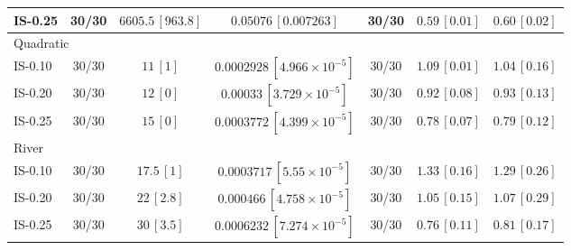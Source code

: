 \begin{tabular}{lcccccc}
IS-0.25 & 30/30 & $6605.5\, [963.8]$ & $0.05076\, [0.007263]$ & 30/30 & $0.59\, [0.01]$ & $0.60\, [0.02]$ \\
\midrule
\multicolumn{7}{l}{Quadratic} \\
IS-0.10 & 30/30 & $11\, [1]$ & $0.0002928\, [4.966\times10^{-5}]$ & 30/30 & $1.09\, [0.01]$ & $1.04\, [0.16]$ \\
IS-0.20 & 30/30 & $12\, [0]$ & $0.00033\, [3.729\times10^{-5}]$ & 30/30 & $0.92\, [0.08]$ & $0.93\, [0.13]$ \\
IS-0.25 & 30/30 & $15\, [0]$ & $0.0003772\, [4.399\times10^{-5}]$ & 30/30 & $0.78\, [0.07]$ & $0.79\, [0.12]$ \\
\midrule
\multicolumn{7}{l}{River} \\
IS-0.10 & 30/30 & $17.5\, [1]$ & $0.0003717\, [5.55\times10^{-5}]$ & 30/30 & $1.33\, [0.16]$ & $1.29\, [0.26]$ \\
IS-0.20 & 30/30 & $22\, [2.8]$ & $0.000466\, [4.758\times10^{-5}]$ & 30/30 & $1.05\, [0.15]$ & $1.07\, [0.29]$ \\
IS-0.25 & 30/30 & $30\, [3.5]$ & $0.0006232\, [7.274\times10^{-5}]$ & 30/30 & $0.76\, [0.11]$ & $0.81\, [0.17]$ \\
\bottomrule
\end{tabular}
